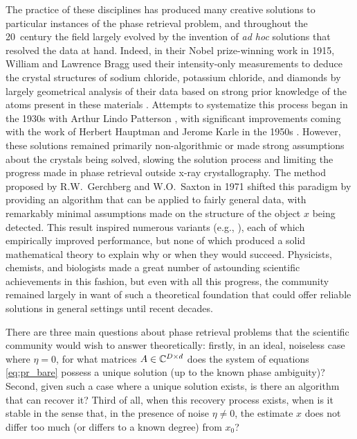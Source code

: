   The practice of these disciplines has produced many creative solutions to particular instances of the phase retrieval problem, and throughout the 20\th\ century the field largely evolved by the invention of \emph{ad hoc} solutions that resolved the data at hand.  Indeed, in their Nobel prize-winning work in 1915, William and Lawrence Bragg used their intensity-only measurements to deduce the crystal structures of sodium chloride, potassium chloride, and diamonds by largely geometrical analysis of their data based on strong prior knowledge of the atoms present in these materials \cite[pp.~88-92, 102-105]{bragg1915crystal_structure}.  Attempts to systematize this process began in the 1930s with Arthur Lindo Patterson \cite{patterson1934fourier_method}, with significant improvements coming with the work of Herbert Hauptman and Jerome Karle in the 1950s \cite{hauptman1953monograph}.  However, these solutions remained primarily non-algorithmic or made strong assumptions about the crystals being solved, slowing the solution process and limiting the progress made in phase retrieval outside x-ray crystallography.  The method proposed by R.W.~Gerchberg and W.O.~Saxton in 1971 \cite{gerchberg1972practical} shifted this paradigm by providing an algorithm that can be applied to fairly general data, with remarkably minimal assumptions made on the structure of the object $x$ being detected.  This result inspired numerous variants (e.g., \cite{bauschke2003hybrid, elser2003phase, fienup1978reconstruction}), each of which empirically improved performance, but none of which produced a solid mathematical theory to explain why or when they would succeed.  Physicists, chemists, and biologists made a great number of astounding scientific achievements in this fashion, but even with all this progress, the community remained largely in want of such a theoretical foundation that could offer reliable solutions in general settings until recent decades.

  
  There are three main questions about phase retrieval problems that the scientific community would wish to answer theoretically: firstly, in an ideal, noiseless case where $\eta = 0$, for what matrices $A \in \mathbb{C}^{D \times d}$ does the system of equations \eqref{eq:pr_bare} possess a unique solution (up to the known phase ambiguity)?  Second, given such a case where a unique solution exists, is there an algorithm that can recover it?  Third of all, when this recovery process exists, when is it stable in the sense that, in the presence of noise $\eta \neq 0$, the estimate $x$ does not differ too much (or differs to a known degree) from $x_0$?

